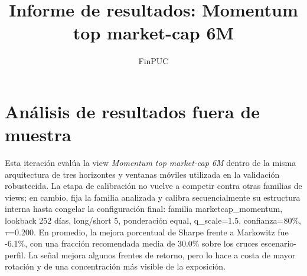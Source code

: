 \documentclass[11pt]{article}
\title{Informe de resultados: Momentum top market-cap 6M}
\author{FinPUC}
\date{}
\begin{document}
\maketitle

\section{Análisis de resultados fuera de muestra}
Esta iteración evalúa la view \textit{Momentum top market-cap 6M} dentro de la misma arquitectura de tres horizontes y ventanas móviles utilizada en la validación robustecida. La etapa de calibración no vuelve a competir contra otras familias de views; en cambio, fija la familia analizada y calibra secuencialmente su estructura interna hasta congelar la configuración final: familia marketcap\_momentum, lookback 252 días, long/short 5, ponderación equal, q\_scale=1.5, confianza=80\%, $\tau$=0.200.
En promedio, la mejora porcentual de Sharpe frente a Markowitz fue -6.1\%, con una fracción recomendada media de 30.0\% sobre los cruces escenario-perfil. La señal mejora algunos frentes de retorno, pero lo hace a costa de mayor rotación y de una concentración más visible de la exposición.
\begin{table}[H]
\centering
{}
\caption{Comparación fuera de muestra en horizonte limpio para Momentum top market-cap 6M.}
\label{tab:momentum_top_marketcap_6m:resultados_oos}
\end{table}
\end{document}
